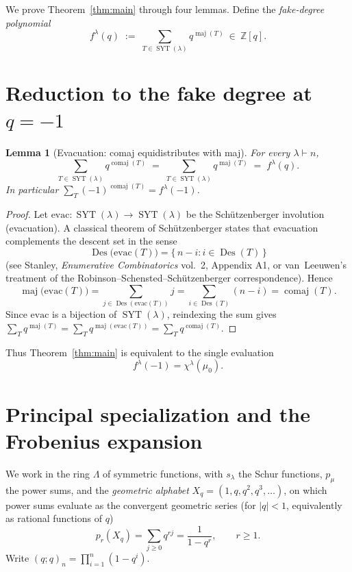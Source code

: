 \documentclass[11pt]{article}
\newtheorem{lemma}{Lemma}
\theoremstyle{definition}
\DeclareMathOperator{\Des}{Des}
\DeclareMathOperator{\maj}{maj}
\DeclareMathOperator{\comaj}{comaj}
\DeclareMathOperator{\SYT}{SYT}
\newcommand{\ZZ}{\mathbb{Z}}
\begin{document}
We prove Theorem~\ref{thm:main} through four lemmas.  Define the
\emph{fake-degree polynomial}
\[
   f^\lambda(q)\;:=\;\sum_{T\in\SYT(\lambda)} q^{\maj(T)}\ \in\ \ZZ[q].
\]

\section{Reduction to the fake degree at $q=-1$}

\begin{lemma}[Evacuation: comaj equidistributes with maj]\label{lem:evac}
For every $\lambda\vdash n$,
\[
   \sum_{T\in\SYT(\lambda)} q^{\comaj(T)} \;=\; \sum_{T\in\SYT(\lambda)} q^{\maj(T)}
   \;=\; f^\lambda(q).
\]
In particular $\sum_T(-1)^{\comaj(T)}=f^\lambda(-1)$.
\end{lemma}

\begin{proof}
Let $\mathrm{evac}\colon\SYT(\lambda)\to\SYT(\lambda)$ be the Sch\"utzenberger
involution (evacuation).  A classical theorem of Sch\"utzenberger states that
evacuation complements the descent set in the sense
\[
   \Des\bigl(\mathrm{evac}(T)\bigr)=\{\,n-i : i\in\Des(T)\,\}
\]
(see Stanley, \emph{Enumerative Combinatorics} vol.~2, Appendix A1, or
van~Leeuwen's treatment of the Robinson--Schensted--Sch\"utzenberger
correspondence).  Hence
\[
   \maj\bigl(\mathrm{evac}(T)\bigr)
   =\sum_{j\in\Des(\mathrm{evac}(T))} j
   =\sum_{i\in\Des(T)}(n-i)
   =\comaj(T).
\]
Since $\mathrm{evac}$ is a bijection of $\SYT(\lambda)$, reindexing the sum gives
$\sum_T q^{\maj(T)}=\sum_T q^{\maj(\mathrm{evac}(T))}=\sum_T q^{\comaj(T)}$.
\end{proof}

Thus Theorem~\ref{thm:main} is equivalent to the single evaluation
\begin{equation}\label{eq:goal}
   f^\lambda(-1)=\chi^\lambda(\mu_0).
\end{equation}

\section{Principal specialization and the Frobenius expansion}

We work in the ring $\Lambda$ of symmetric functions, with $s_\lambda$ the Schur
functions, $p_\mu$ the power sums, and the \emph{geometric alphabet}
$X_q=(1,q,q^2,q^3,\dots)$, on which power sums evaluate as the convergent
geometric series (for $|q|<1$, equivalently as rational functions of $q$)
\begin{equation}\label{eq:psum-geom}
   p_r(X_q)=\sum_{j\ge 0} q^{rj}=\frac{1}{1-q^r}, \qquad r\ge 1.
\end{equation}
Write $(q;q)_n=\prod_{i=1}^n(1-q^i)$.
\end{document}
